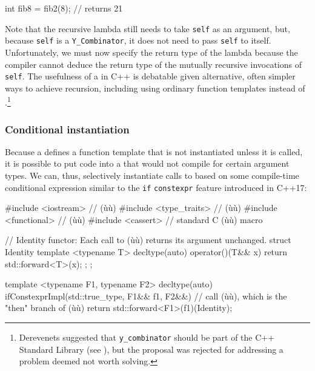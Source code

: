 {\begin{emcppslisting}
int fib8 = fib2(8);  // returns 21
\end{emcppslisting}
    

\noindent Note that the recursive lambda still needs to take \lstinline!self! as an
argument, but, because \lstinline!self! is a \lstinline!Y_Combinator!, it
does not need to pass \lstinline!self! to itself. Unfortunately, we must
now specify the return type of the lambda because the compiler cannot
deduce the return type of the mutually recursive invocations of
\lstinline!self!. The usefulness of a  in C++ is
debatable given alternative, often simpler ways to achieve recursion,
including using ordinary function templates instead of .{\cprotect\footnote{Derevenets suggested that
\lstinline!y_combinator! should be part of the C++ Standard Library (see
\cite{derevenets16}), but the proposal was rejected for addressing
  a problem deemed not worth solving.}}

\subsubsection[Conditional instantiation]{Conditional instantiation}\label{conditional-instantiation}

Because a  defines a function template that is
not instantiated unless it is called, it is possible to put code into a
 that would not compile for certain argument
types. We can, thus, selectively instantiate calls to  based on some compile-time conditional expression similar to
the \lstinline!if! \lstinline!constexpr! feature introduced in C++17:

\begin{emcppslisting}
#include <iostream>     // (ù{}ù)
#include <type_traits>  // (ù{}ù)
#include <functional>   // (ù{}ù)
#include <cassert>      // standard C (ù{}ù) macro

// Identity functor: Each call to (ù{}ù) returns its argument unchanged.
struct Identity
{
    template <typename T>
    decltype(auto) operator()(T&& x) { return std::forward<T>(x); };
};

template <typename F1, typename F2>
decltype(auto) ifConstexprImpl(std::true_type, F1&& f1, F2&&)
    // call (ù{}ù), which is the "then" branch of (ù{}ù)
{
    return std::forward<F1>(f1)(Identity{});
}


\end{emcppslisting}}
